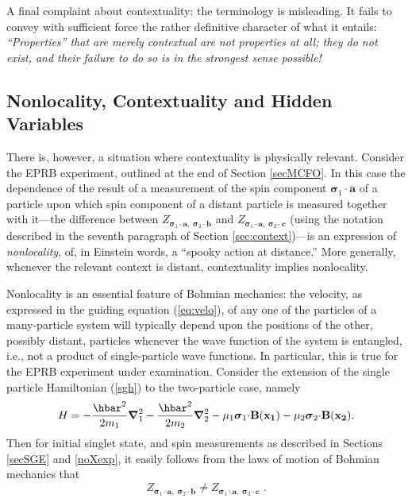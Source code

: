 \documentclass[12pt]{article}
\begin{document}
A final complaint about contextuality: the terminology is misleading.
It fails to convey with sufficient force the rather definitive
character of what it entails: {\it ``Properties'' that are merely
   contextual are not properties at all; they do not exist, and their
   failure to do so is in the strongest sense possible!}



\subsection{Nonlocality, Contextuality and Hidden Variables}

There is, however, a situation where contextuality is physically
relevant. Consider the EPRB experiment, outlined at the end of Section
\ref{secMCFO}.  In this case the dependence of the result of a
measurement of the spin component $\boldsymbol{\sigma}_{1}\cdot
\mathbf{a}$ of a particle upon which spin component of a distant
particle is measured together with it---the difference between
$Z_{\boldsymbol{\sigma}_{1}\cdot \mathbf{a},\;
   \boldsymbol{\sigma}_{2}\cdot \mathbf{b}}$ and
$Z_{\boldsymbol{\sigma}_{1}\cdot \mathbf{a},\;
   \boldsymbol{\sigma}_{2}\cdot \mathbf{c}}$ (using the notation
described in the seventh paragraph of Section \ref{sec:context})---is
an expression of {\em nonlocality}, of, in Einstein words, a ``spooky
action at distance.'' More generally, whenever the relevant context is
distant, contextuality implies nonlocality.

Nonlocality is an essential feature of Bohmian mechanics: the
velocity, as expressed in the guiding equation (\ref{eq:velo}), of any
one of the particles of a many-particle system will typically depend
upon the positions of the other, possibly distant, particles whenever
the wave function of the system is entangled, i.e., not a product of
single-particle wave functions.  In particular, this is true for the
EPRB experiment under examination. Consider the extension of the
single particle Hamiltonian (\ref{sgh}) to the two-particle case,
namely $$
H = -\frac{\hbar^{2}}{2m_{1}} \boldsymbol{\nabla}_{1}^{2}
-\frac{\hbar^{2}}{2m_{2}} \boldsymbol{\nabla}_{2}^{2}-
\mu_{1}\boldsymbol{\sigma}_1 {\bf \cdot B(\mathbf{ x_{1}) }}
-\mu_{2}\boldsymbol{\sigma}_2 {\bf \cdot B(\mathbf{x_{2}) }} .  $$
Then for initial singlet state, and spin measurements as described in
Sections \ref{secSGE} and \ref{noXexp}, it easily follows {}from the
laws of motion of Bohmian mechanics that
$$Z_{\boldsymbol{\sigma}_{1}\cdot \mathbf{a},\;
   \boldsymbol{\sigma}_{2}\cdot \mathbf{b}} \neq
Z_{\boldsymbol{\sigma}_{1}\cdot \mathbf{a},\;
   \boldsymbol{\sigma}_{2}\cdot \mathbf{c}}\;.$$
\end{document}
